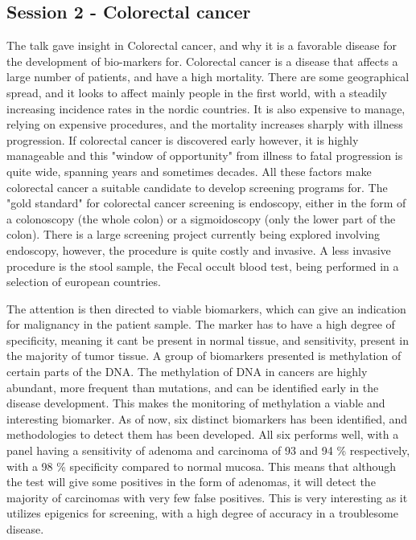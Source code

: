 \documentclass[12p]{article}
\begin{document}
\subsection*{Session 2 - Colorectal cancer}

The talk gave insight in Colorectal cancer, and why it is a favorable disease for the development of bio-markers for.
Colorectal cancer is a disease that affects a large number of patients, and have a high mortality.
There are some geographical spread, and it looks to affect mainly people in the first world, with a steadily increasing incidence rates in the nordic countries.
It is also expensive to manage, relying on expensive procedures, and the mortality increases sharply with illness progression.
If colorectal cancer is discovered early however, it is highly manageable and this "window of opportunity" from illness to fatal progression is quite wide, spanning years and sometimes decades.
All these factors make colorectal cancer a suitable candidate to develop screening programs for.
The "gold standard" for colorectal cancer screening is endoscopy, either in the form of a colonoscopy (the whole colon) or a sigmoidoscopy (only the lower part of the colon).
There is a large screening project currently being explored involving endoscopy, however, the procedure is quite costly and invasive.
A less invasive procedure is the stool sample, the Fecal occult blood test, being performed in a selection of european countries.

The attention is then directed to viable biomarkers, which can give an indication for malignancy in the patient sample.
The marker has to have a high degree of specificity, meaning it cant be present in normal tissue, and sensitivity, present in the majority of tumor tissue.
A group of biomarkers presented is methylation of certain parts of the DNA.
The methylation of DNA in cancers are highly abundant, more frequent than mutations, and can be identified early in the disease development.
This makes the monitoring of methylation a viable and interesting biomarker.
As of now, six distinct biomarkers has been identified, and methodologies to detect them has been developed.
All six performs well, with a panel having a sensitivity of adenoma and carcinoma of 93 and 94 \% respectively, with a 98 \% specificity compared to normal mucosa.
This means that although the test will give some positives in the form of adenomas, it will detect the majority of carcinomas with very few false positives.
This is very interesting as it utilizes epigenics for screening, with a high degree of accuracy in a troublesome disease.
\end{document}
